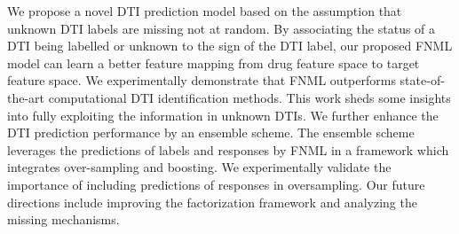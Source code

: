 \documentclass[conference]{IEEEtran}
\begin{document}
We propose a novel DTI prediction model based on the assumption that unknown DTI labels are missing not at random. By associating the status of a DTI being labelled or unknown to the sign of the DTI label, our proposed FNML model can learn a better feature mapping from drug feature space to target feature space. We experimentally demonstrate that FNML outperforms state-of-the-art computational DTI identification methods. This work sheds some insights into fully exploiting the information in unknown DTIs. We further enhance the DTI prediction performance by an ensemble scheme. The ensemble scheme leverages the predictions of labels and responses by FNML in a framework which integrates over-sampling and boosting. We experimentally validate the importance of including predictions of responses in oversampling. Our future directions include improving the factorization framework and analyzing the missing mechanisms. 
\end{document}
